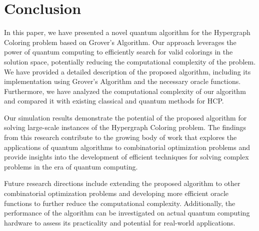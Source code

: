 \section{Conclusion}

In this paper, we have presented a novel quantum algorithm for the Hypergraph Coloring problem based on Grover's Algorithm. Our approach leverages the power of quantum computing to efficiently search for valid colorings in the solution space, potentially reducing the computational complexity of the problem. We have provided a detailed description of the proposed algorithm, including its implementation using Grover's Algorithm and the necessary oracle functions. Furthermore, we have analyzed the computational complexity of our algorithm and compared it with existing classical and quantum methods for HCP.

Our simulation results demonstrate the potential of the proposed algorithm for solving large-scale instances of the Hypergraph Coloring problem. The findings from this research contribute to the growing body of work that explores the applications of quantum algorithms to combinatorial optimization problems and provide insights into the development of efficient techniques for solving complex problems in the era of quantum computing.

Future research directions include extending the proposed algorithm to other combinatorial optimization problems and developing more efficient oracle functions to further reduce the computational complexity. Additionally, the performance of the algorithm can be investigated on actual quantum computing hardware to assess its practicality and potential for real-world applications.


